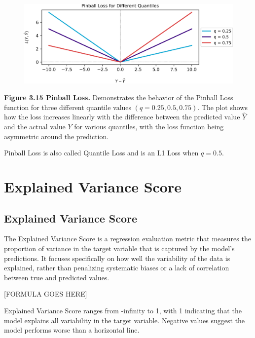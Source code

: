 \clearpage

\thispagestyle{customstyle}

\begin{figure}[ht!]
    \centering
    \includegraphics[width=\textwidth]{figures/Pinball_Loss.png}
    \label{Pinball_Loss}
\end{figure}


\textbf{Figure 3.15 Pinball Loss.} Demonstrates the behavior of the Pinball Loss function for three different quantile values $(q = 0.25, 0.5, 0.75)$.
The plot shows how the loss increases linearly with the difference between the predicted value $\hat{Y}$ and the actual value $Y$ for various quantiles, with the loss function being asymmetric around the prediction.

{Pinball Loss is also called Quantile Loss and is an L1 Loss when $q=0.5$.}

\clearpage
\thispagestyle{regressionstyle}
\section{Explained Variance Score}
\subsection{Explained Variance Score}

The Explained Variance Score is a regression evaluation metric that measures the proportion of variance in the target variable that is captured by the model’s predictions.
It focuses specifically on how well the variability of the data is explained, rather than penalizing systematic biases or a lack of correlation between true and predicted values.

\begin{center}
    [FORMULA GOES HERE]
\end{center}

Explained Variance Score ranges from -infinity to 1, with 1 indicating that the model explains all variability in the target variable. Negative values suggest the model performs worse
than a horizontal line.

